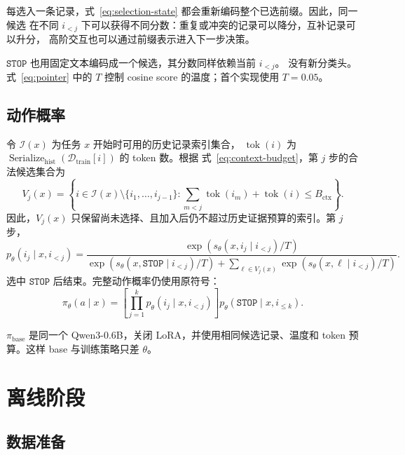 \documentclass[11pt,UTF8,fontset=none]{ctexart}
\newcommand{\Dtrain}{\mathcal D_{\mathrm{train}}}
\newcommand{\policy}{\pi_{\theta}}
\newcommand{\basepolicy}{\pi_{\mathrm{base}}}
\begin{document}
每选入一条记录，式~\eqref{eq:selection-state} 都会重新编码整个已选前缀。因此，同一候选
在不同 \(i_{<j}\) 下可以获得不同分数：重复或冲突的记录可以降分，互补记录可以升分，
高阶交互也可以通过前缀表示进入下一步决策。

\(\mathtt{STOP}\) 也用固定文本编码成一个候选，其分数同样依赖当前 \(i_{<j}\)。
没有新分类头。式~\eqref{eq:pointer} 中的 \(T\) 控制 cosine score 的温度；首个实现使用
\(T=0.05\)。

\subsection{动作概率}

令 \(\mathcal I(x)\) 为任务 \(x\) 开始时可用的历史记录索引集合，
\(\operatorname{tok}(i)\) 为
\(\operatorname{Serialize}_{\mathrm{hist}}(\Dtrain[i])\) 的 token 数。根据
式~\eqref{eq:context-budget}，第 \(j\) 步的合法候选集合为
\begin{equation}
  V_j(x)
  =
  \left\{
    i\in\mathcal I(x)\setminus\{i_1,\ldots,i_{j-1}\}:
    \sum_{m<j}\operatorname{tok}(i_m)+\operatorname{tok}(i)
    \le B_{\mathrm{ctx}}
  \right\}.
  \label{eq:valid-candidate-set}
\end{equation}
因此，\(V_j(x)\) 只保留尚未选择、且加入后仍不超过历史证据预算的索引。第 \(j\) 步，
\begin{equation}
  p_{\theta}(i_j\mid x,i_{<j})
  =
  \frac{\exp(s_{\theta}(x,i_j\mid i_{<j})/T)}
  {\exp(s_{\theta}(x,\mathtt{STOP}\mid i_{<j})/T)
   +\sum_{\ell\in V_j(x)}
    \exp(s_{\theta}(x,\ell\mid i_{<j})/T)}.
  \label{eq:pointer}
\end{equation}
选中 \(\mathtt{STOP}\) 后结束。完整动作概率仍使用原符号：
\begin{equation}
  \policy(a\mid x)
  =
  \left[
    \prod_{j=1}^{k}
    p_{\theta}(i_j\mid x,i_{<j})
  \right]
  p_{\theta}(\mathtt{STOP}\mid x,i_{\le k}).
  \label{eq:policy}
\end{equation}

\(\basepolicy\) 是同一个 Qwen3-0.6B，关闭 LoRA，并使用相同候选记录、温度和 token
预算。这样 base 与训练策略只差 \(\theta\)。

\section{离线阶段}

\subsection{数据准备}
\end{document}
